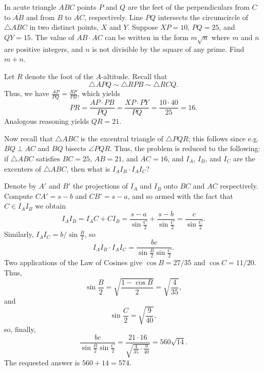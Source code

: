 \documentclass[11pt]{article}
\theoremstyle{definition}
\begin{document}
\begin{question}[name={2019 AIME II, \href{https://artofproblemsolving.com/community/c4p12030181}{Problem 15}}]
	In acute triangle $ABC$ points $P$ and $Q$ are the feet of the perpendiculars from $C$ to $\overline{AB}$ and from $B$ to $\overline{AC}$, respectively. Line $PQ$ intersects the circumcircle of $\triangle ABC$ in two distinct points, $X$ and $Y$. Suppose $XP=10$, $PQ=25$, and $QY=15$. The value of $AB\cdot AC$ can be written in the form $m\sqrt n$ where $m$ and $n$ are positive integers, and $n$ is not divisible by the square of any prime. Find $m+n$.
\end{question}


\begin{solution}[name={Solution by Michael Tang}]
	Let $R$ denote the foot of the $A$-altitude. Recall that\[\triangle APQ\sim\triangle RPB\sim\triangle RCQ.\]Thus, we have $\tfrac{AP}{PQ} = \tfrac{RP}{PB}$, which yields
	\[PR = \dfrac{AP\cdot PB}{PQ} = \dfrac{XP\cdot PY}{PQ} = \dfrac{10\cdot 40}{25} =16.\]Analogous reasoning yields $QR=21$.
	
	Now recall that $\triangle ABC$ is the excentral triangle of $\triangle PQR$; this follows since e.g. $BQ\perp AC$ and $BQ$ bisects $\angle PQR$. Thus, the problem is reduced to the following: if $\triangle ABC$ satisfies $BC=25$, $AB=21$, and $AC=16$, and $I_A$, $I_B$, and $I_C$ are the excenters of $\triangle ABC$, then what is $I_AI_B\cdot I_AI_C$?
	
	Denote by $A'$ and $B'$ the projections of $I_A$ and $I_B$ onto $BC$ and $AC$ respectively. Compute $CA'=s-b$ and $CB' = s-a$, and so armed with the fact that $C\in\overline{I_AI_B}$ we obtain\[I_AI_B = I_AC+CI_B = \dfrac{s-a}{\sin\frac C2} + \dfrac{s-b}{\sin\frac C2} = \dfrac{c}{\sin\frac C2}.\]
	Similarly, $I_AI_C = {b}/{\sin \frac B2}$, so\[I_AI_B\cdot I_AI_C = \dfrac{bc}{\sin\frac B2\sin\frac C2}.\]Two applications of the Law of Cosines give $\cos B = {27}/{35}$ and $\cos C = {11}/{20}$. Thus, $$\sin\frac B2 = \sqrt{\frac{1-\cos B}2} = \sqrt{\frac{4}{35}},$$ and $$\sin\frac C2 = \sqrt{\frac{9}{40}},$$ so, finally, 
	\[\frac{bc}{\sin\frac B2\sin\frac C2} = \frac{21\cdot 16}{\sqrt{\frac{4}{35}\cdot\frac{9}{40}}} = 560\sqrt{14}.\]The requested answer is $560+14=\boxed{574}$.
\end{solution}
\end{document}
